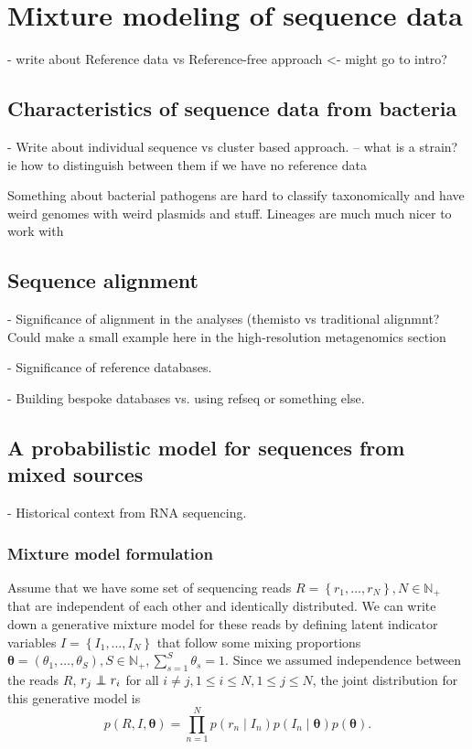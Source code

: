 \documentclass[officiallayout]{tktla}
\newcommand\indept{\protect\mathpalette{\protect\independenT}{\perp}}
\def\independenT#1#2{\mathrel{\rlap{$#1#2$}\mkern2mu{#1#2}}}
\begin{document}
\chapter{Mixture modeling of sequence data}

- write about Reference data vs Reference-free approach <- might go to intro?

\section{Characteristics of sequence data from bacteria}
\label{section:bacterial-data}

- Write about individual sequence vs cluster based approach.
-- what is a strain? ie how to distinguish between them if we have no reference data

Something about bacterial pathogens are hard to classify taxonomically
and have weird genomes with weird plasmids and stuff.  Lineages are
much much nicer to work with

\section{Sequence alignment}
\label{section:sequence-alignment}
- Significance of alignment in the analyses (themisto vs traditional alignmnt? Could make a small example here in the high-resolution metagenomics section

- Significance of reference databases.

- Building bespoke databases vs. using refseq or something else.

\section{A probabilistic model for sequences from mixed sources}
\label{section:model}

- Historical context from RNA sequencing.

\subsection{Mixture model formulation}

Assume that we have some set of sequencing reads $R = \left\{r_{1},
\dots, r_{N}\right\}, N \in \mathbb{N}_{+}$ that are independent of
each other and identically distributed. We can write down a generative
mixture model for these reads by defining latent indicator variables
$I = \left\{I_{1}, \dots, I_{N}\right\}$ that follow some mixing
proportions $\boldsymbol{\theta} = \left(\theta_{1}, \dots,
\theta_{S}\right), S \in \mathbb{N}_{+}, \sum_{s = 1}^{S} \theta_{s} =
1$. Since we assumed independence between the reads $R$, $r_{j}
\indept r_{i}$ for all $i \neq j, 1 \leq i \leq N, 1 \leq j \leq N$, the joint
distribution for this generative model is
\begin{equation}
  \label{model:joint-distribution}
  p\left(R, I, \boldsymbol\theta\right) = \prod_{n = 1}^{N}p\left(r_{n} \middle| I_{n}\right) p\left(I_{n} \middle| \boldsymbol\theta\right)p\left(\boldsymbol\theta\right).
\end{equation}
\end{document}

